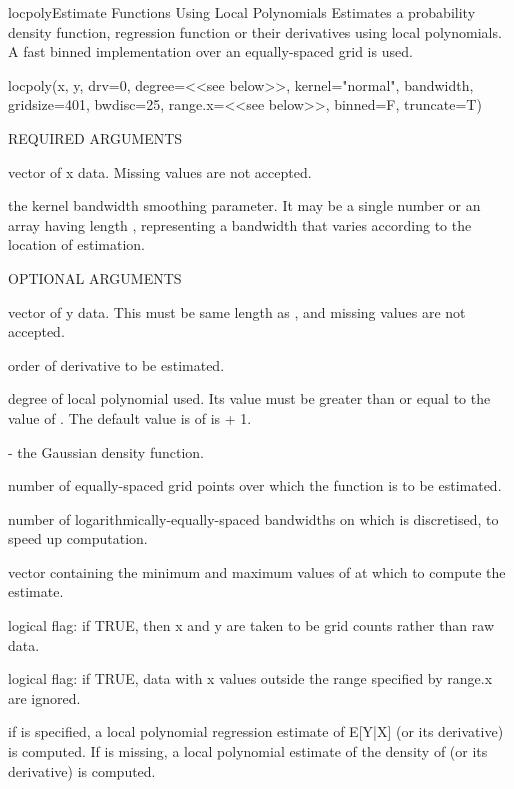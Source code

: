 \begin{Helpfile}{locpoly}{Estimate Functions Using Local Polynomials}
Estimates a probability density function,  
regression function or their derivatives
using local polynomials. A fast binned implementation
over an equally-spaced grid is used.
\begin{Example}
locpoly(x, y, drv=0, degree=<<see below>>, kernel="normal", 
        bandwidth, gridsize=401, bwdisc=25, 
        range.x=<<see below>>,  binned=F, truncate=T)
\end{Example}
\begin{Argument}{REQUIRED ARGUMENTS}
\item[\Co{x:}]
vector of x data.
Missing values are not accepted.
\item[\Co{bandwidth:}]
the kernel bandwidth smoothing parameter.
It may be a single number or an array having
length , representing a bandwidth
that varies according to the location of
estimation.
\end{Argument}
\begin{Argument}{OPTIONAL ARGUMENTS}
\item[\Co{y:}]
vector of y data.
This must be same length as , and
missing values are not accepted.
\item[\Co{drv:}]
order of derivative to be estimated.
\item[\Co{degree:}]
degree of local polynomial used. Its value
must be greater than or equal to the value
of . The default value is of  is
 + 1.
\item[\Co{kernel:}]
 - the Gaussian density function.
\item[\Co{gridsize:}]
number of equally-spaced grid points over which the 
function is to be estimated.
\item[\Co{bwdisc:}]
number of logarithmically-equally-spaced bandwidths
on which  is discretised, to speed up
computation.
\item[\Co{range.x:}]
vector containing the minimum and maximum values of  at which to
compute the estimate.
\item[\Co{binned:}]
logical flag: if TRUE, then x and y are taken to be grid counts
rather than raw data. 
\item[\Co{truncate:}]
logical flag: if TRUE, data with x values outside the range specified
by range.x are ignored.
\end{Argument}
if  is specified, a local polynomial regression estimate of 
E[Y|X] (or its derivative) is computed.
If  is missing, a local polynomial estimate of the density
of  (or its derivative) is computed.


\end{Helpfile}
